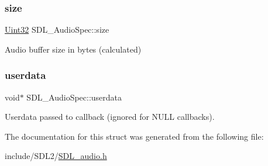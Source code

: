 \subsubsection{\texorpdfstring{size}{size}}
{\footnotesize\ttfamily \hyperlink{_s_d_l__stdinc_8h_add440eff171ea5f55cb00c4a9ab8672d}{Uint32} S\+D\+L\+\_\+\+Audio\+Spec\+::size}

Audio buffer size in bytes (calculated) \mbox{\label{struct_s_d_l___audio_spec_aeec9481666f5f0982c98d3878f175d9b}} 
\subsubsection{\texorpdfstring{userdata}{userdata}}
{\footnotesize\ttfamily void$\ast$ S\+D\+L\+\_\+\+Audio\+Spec\+::userdata}

Userdata passed to callback (ignored for N\+U\+LL callbacks). 

The documentation for this struct was generated from the following file\+:\begin{DoxyCompactItemize}
\item 
include/\+S\+D\+L2/\hyperlink{_s_d_l__audio_8h}{S\+D\+L\+\_\+audio.\+h}\end{DoxyCompactItemize}
